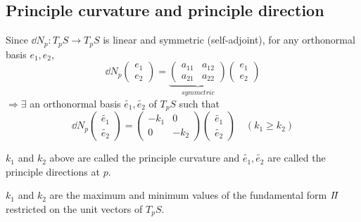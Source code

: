 \subsection{Principle curvature and principle direction}
Since \(\dd N_p\colon T_p S\to T_p S\) is linear and 
symmetric (self-adjoint), for any orthonormal basis {\(e_1,e_2\)},
\[
        \dd N_p\begin{pmatrix}
            e_1\\
            e_2
        \end{pmatrix}
        =\underbrace{\begin{pmatrix}
            a_{11}&a_{12}\\
            a_{21}&a_{22}
        \end{pmatrix}}_{symmetric}
        \begin{pmatrix}
            e_1\\
            e_2
        \end{pmatrix}
\]
\(\Rightarrow \exists\) an orthonormal basis {\(\tilde{e_1}
,\tilde{e_2}\)} of \(T_p S\) such that 
\[
        \dd{N}_p \begin{pmatrix}
            \tilde{e_1}\\
            \tilde{e_2}
        \end{pmatrix}
        =\begin{pmatrix}
            -k_1& 0\\
            0&-k_2
        \end{pmatrix}\begin{pmatrix}
            \tilde{e_1}\\
            \tilde{e_2}
        \end{pmatrix}
        \quad (k_1\ge k_2)
\]
\begin{definition}
    \(k_1\) and \(k_2\) above are called the principle curvature
    and \(\tilde{e_1},\tilde{e_2}\) are called the principle
    directions at \(p\).
\end{definition}
\begin{remark}
    \(k_1\) and \(k_2\) are the maximum and minimum values of 
    the  fundamental form \(I\!I\) restricted on 
    the unit vectors of \(T_p S\).
\end{remark}
